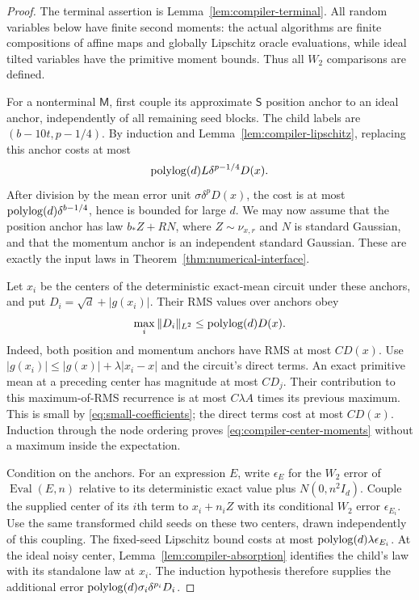 \begin{proof}
The terminal assertion is Lemma~\ref{lem:compiler-terminal}.
All random variables below have finite second moments: the actual
algorithms are finite compositions of affine maps and globally
Lipschitz oracle evaluations, while ideal tilted variables have the
primitive moment bounds.  Thus all $W_2$ comparisons are defined.

For a nonterminal $\mathsf M$, first couple its approximate
$\mathsf S$ position anchor to an ideal anchor, independently of
all remaining seed blocks.  The child labels are
$(b-10t,p-1/4)$.  By induction and
Lemma~\ref{lem:compiler-lipschitz}, replacing this anchor costs at
most
\[
 \operatorname{polylog}(d)L\delta^{p-1/4}D(x).
\]
After division by the mean error unit $\sigma\delta^pD(x)$,
the cost is at most
$\operatorname{polylog}(d)\delta^{b-1/4}$, hence is bounded for large $d$.
We may now assume that the position anchor has law $b_*Z+RN$,
where $Z\sim\nu_{x,r}$ and $N$ is standard Gaussian, and that the
momentum anchor is an independent standard Gaussian.  These are exactly
the input laws in Theorem~\ref{thm:numerical-interface}.

Let $x_i$ be the centers of the deterministic exact-mean circuit
under these anchors, and put $D_i=\sqrt d+|g(x_i)|$.
Their RMS values over anchors obey
\begin{equation}
 \max_i\|D_i\|_{L^2}\le\operatorname{polylog}(d)D(x).
 \label{eq:compiler-center-moments}
\end{equation}
Indeed, both position and momentum anchors have RMS at most $CD(x)$.
Use $|g(x_i)|\le|g(x)|+\lambda|x_i-x|$ and the circuit's
direct terms.  An exact primitive mean at a preceding center has
magnitude at most $CD_j$.  Their contribution to this maximum-of-RMS
recurrence is at most $C\lambda A$ times its previous maximum.
This is small by \eqref{eq:small-coefficients}; the direct terms cost
at most $CD(x)$.  Induction through the node ordering proves
\eqref{eq:compiler-center-moments} without a maximum inside the
expectation.

Condition on the anchors.  For an expression $E$, write
$\epsilon_E$ for the $W_2$ error of
$\operatorname{Eval}(E,n)$ relative to its deterministic exact
value plus $N(0,n^2I_d)$.  Couple the supplied center of its $i$th
term to $x_i+n_iZ$ with its conditional $W_2$ error
$\epsilon_{E_i}$.  Use the same transformed child seeds on these
two centers, drawn independently of this coupling.  The fixed-seed
Lipschitz bound costs at most
$\operatorname{polylog}(d)\lambda\epsilon_{E_i}$.
At the ideal noisy center, Lemma~\ref{lem:compiler-absorption}
identifies the child's law with its standalone law at $x_i$.
The induction hypothesis therefore supplies the additional error
$\operatorname{polylog}(d)\sigma_i\delta^{p_i}D_i$.


\end{proof}
